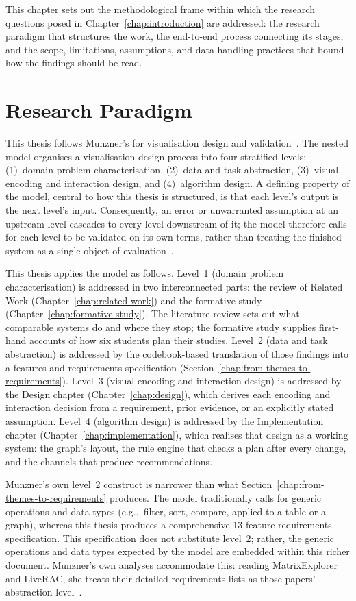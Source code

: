 \label{chap:methodology}
This chapter sets out the methodological frame within which the research questions posed in Chapter~\ref{chap:introduction} are addressed: the research paradigm that structures the work, the end-to-end process connecting its stages, and the scope, limitations, assumptions, and data-handling practices that bound how the findings should be read.

\section{Research Paradigm}
\label{sec:paradigm}
This thesis follows Munzner's  for visualisation design and validation~\cite{munzner2009}. The nested model organises a visualisation design process into four stratified levels: (1)~domain problem characterisation, (2)~data and task abstraction, (3)~visual encoding and interaction design, and (4)~algorithm design. A defining property of the model, central to how this thesis is structured, is that each level's output is the next level's input. Consequently, an error or unwarranted assumption at an upstream level cascades to every level downstream of it; the model therefore calls for each level to be validated on its own terms, rather than treating the finished system as a single object of evaluation~\cite{munzner2009}.

This thesis applies the model as follows. Level~1 (domain problem
characterisation) is addressed in two interconnected parts: the review of Related
Work (Chapter~\ref{chap:related-work}) and the formative study
(Chapter~\ref{chap:formative-study}). The literature review sets out what
comparable systems do and where they stop; the formative study supplies
first-hand accounts of how six students plan their studies. Level~2 (data and
task abstraction) is addressed by the codebook-based translation of those
findings into a features-and-requirements specification
(Section~\ref{chap:from-themes-to-requirements}). Level~3 (visual encoding and
interaction design) is addressed by the Design chapter
(Chapter~\ref{chap:design}), which derives each encoding and interaction decision
from a requirement, prior evidence, or an explicitly stated assumption. Level~4
(algorithm design) is addressed by the Implementation chapter
(Chapter~\ref{chap:implementation}), which realises that design as a working
system: the graph's layout, the rule engine that checks a plan after every
change, and the channels that produce recommendations.

Munzner's own level~2 construct is narrower than what
Section~\ref{chap:from-themes-to-requirements} produces. The model traditionally
calls for generic operations and data types (e.g.,\ filter, sort, compare,
applied to a table or a graph), whereas this thesis produces a comprehensive
13-feature requirements specification. This specification does not substitute
level~2; rather, the generic operations and data types expected by the model are
embedded within this richer document. Munzner's own analyses accommodate this:
reading MatrixExplorer and LiveRAC, she treats their detailed requirements lists
as those papers' abstraction level~\cite{munzner2009}.

